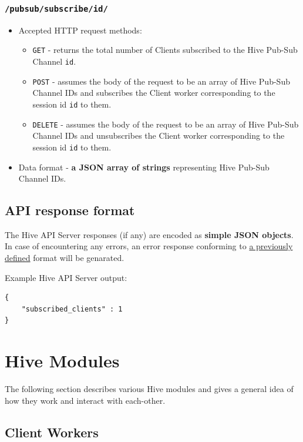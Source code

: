 \documentclass[a4paper]{article}
\begin{document}
\subsubsection{\texttt{/pubsub/subscribe/id/}}
\label{sec-6-1-8}



\begin{itemize}
\item Accepted HTTP request methods:
\begin{itemize}
\item \texttt{GET} - returns the total number of Clients subscribed to the Hive Pub-Sub Channel \texttt{id}.
\item \texttt{POST} - assumes the body of the request to be an array of Hive Pub-Sub Channel IDs and subscribes the Client worker corresponding to the session id \texttt{id} to them.
\item \texttt{DELETE} - assumes the body of the request to be an array of Hive Pub-Sub Channel IDs and unsubscribes the Client worker corresponding to the session id \texttt{id} to them.
\end{itemize}
\item Data format - \textbf{a JSON array of strings} representing Hive Pub-Sub Channel IDs.
\end{itemize}
\subsection{API response format}
\label{sec-6-2}

The Hive API Server responses (if any) are encoded as \textbf{simple JSON objects}. In case of encountering any errors, an error response conforming to \hyperref[sec-5-4]{a previously defined} format will be genarated.

\noindent
Example Hive API Server output:

\begin{verbatim}
{
    "subscribed_clients" : 1
}
\end{verbatim}




\pagebreak
\section{Hive Modules}
\label{sec-7}

The following section describes various Hive modules and gives a general idea of how they work and interact with each-other.
\subsection{Client Workers}
\label{sec-7-1}
\end{document}
